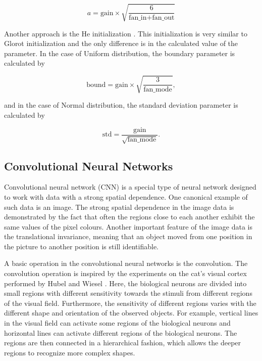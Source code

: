 \begin{equation}
    a = \text{gain} \times \sqrt{\frac{6}{\text{fan\_in} + \text{fan\_out}}}
\end{equation}

Another approach is the He initialization \cite{he2015delving}.
This initialization is very similar to Glorot initialization and the only difference is in the calculated value of the parameter.
In the case of Uniform distribution, the boundary parameter is calculated by

\begin{equation}
    \text{bound} = \text{gain} \times \sqrt{\frac{3}{\text{fan\_mode}}},
\end{equation}

and in the case of Normal distribution, the standard deviation parameter is calculated by

\begin{equation}
    \text{std} = \frac{\text{gain}}{\sqrt{\text{fan\_mode}}}.
\end{equation}

\subsection{Convolutional Neural Networks}
Convolutional neural network (CNN) is a special type of neural network designed to work with data with a strong spatial dependence.
One canonical example of such data is an image.
The strong spatial dependence in the image data is demonstrated by the fact that often the regions close to each another exhibit the same values of the pixel colours.
Another important feature of the image data is the translational invariance, meaning that an object moved from one position in the picture to another position is still identifiable.

A basic operation in the convolutional neural networks is the convolution.
The convolution operation is inspired by the experiments on the cat's visual cortex performed by Hubel and Wiesel \cite{hubel1959receptive}.
Here, the biological neurons are divided into small regions with different sensitivity towards the stimuli from different regions of the visual field.
Furthermore, the sensitivity of different regions varies with the different shape and orientation of the observed objects.
For example, vertical lines in the visual field can activate some regions of the biological neurons and horizontal lines can activate different regions of the biological neurons.
The regions are then connected in a hierarchical fashion, which allows the deeper regions to recognize more complex shapes.%

